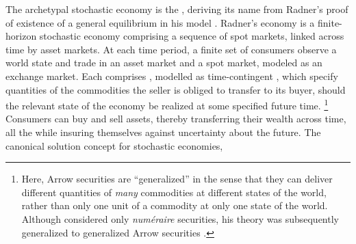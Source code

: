 The archetypal stochastic economy is the , deriving its name from Radner's proof of existence of a general equilibrium in his model \cite{radner1972existence}.
Radner's economy is a finite-horizon stochastic economy comprising a sequence of spot markets, linked across time by asset markets.
At each time period, a finite set of consumers observe a world state and trade in an asset market and a spot market, modeled as an exchange market. 
Each  comprises , modelled as time-contingent , which specify quantities of the commodities the seller is obliged to transfer to its buyer, should the relevant state of the economy be realized at some specified future time.%
\footnote{Here, Arrow securities are ``generalized'' in the sense that they can deliver different quantities of \emph{many\/} commodities at different states of the world, rather than only one unit of a commodity at only one state of the world. Although \citet{arrow1964role} considered only \textit{num\'eraire} securities, 
his theory was subsequently generalized to %
generalized Arrow securities \cite{geanakoplos1990introduction}.} 
Consumers can buy and sell assets, thereby transferring their wealth across time, all the while insuring themselves against uncertainty about the future.
The canonical solution concept for stochastic economies, 
